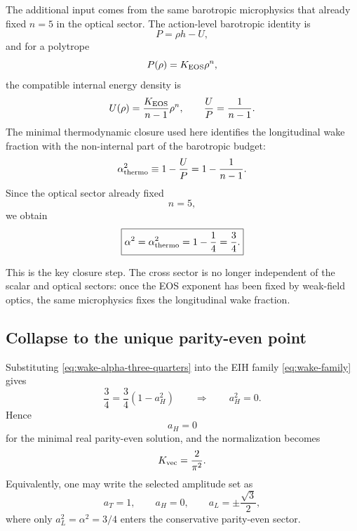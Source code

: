 \documentclass[11pt]{article}
\begin{document}
The additional input comes from the same barotropic microphysics that already fixed
\(n=5\) in the optical sector. The action-level barotropic identity is
\begin{equation}
P=\rho h-U,
\label{eq:wake-thermo-identity}
\end{equation}
and for a polytrope
\begin{equation}
P(\rho)=K_{\rm EOS}\rho^n,
\label{eq:wake-thermo-polytrope}
\end{equation}
the compatible internal energy density is
\begin{equation}
U(\rho)=\frac{K_{\rm EOS}}{n-1}\rho^n,
\qquad
\frac{U}{P}=\frac{1}{n-1}.
\label{eq:wake-UP-ratio}
\end{equation}
The minimal thermodynamic closure used here identifies the longitudinal wake fraction with
the non-internal part of the barotropic budget:
\begin{equation}
\alpha^2_{\rm thermo}
\equiv
1-\frac{U}{P}
=
1-\frac{1}{n-1}.
\label{eq:wake-thermo-alpha}
\end{equation}
Since the optical sector already fixed
\begin{equation}
n=5,
\label{eq:wake-n-five}
\end{equation}
we obtain
\begin{equation}
\boxed{
\alpha^2=\alpha^2_{\rm thermo}=1-\frac14=\frac34.
}
\label{eq:wake-alpha-three-quarters}
\end{equation}

This is the key closure step. The cross sector is no longer independent of the scalar and
optical sectors: once the EOS exponent has been fixed by weak-field optics, the same
microphysics fixes the longitudinal wake fraction.

\subsection{Collapse to the unique parity-even point}
\label{sec:wake-unique}

Substituting \eqref{eq:wake-alpha-three-quarters} into the EIH family
\eqref{eq:wake-family} gives
\begin{equation}
\frac34=\frac34(1-a_H^2)
\qquad\Longrightarrow\qquad
a_H^2=0.
\label{eq:wake-aH-zero}
\end{equation}
Hence
\begin{equation}
a_H=0
\label{eq:wake-aH-zero-sign}
\end{equation}
for the minimal real parity-even solution, and the normalization becomes
\begin{equation}
K_{\rm vec}=\frac{2}{\pi^2}.
\label{eq:wake-K-two-over-pi2}
\end{equation}
Equivalently, one may write the selected amplitude set as
\begin{equation}
a_T=1,
\qquad
a_H=0,
\qquad
a_L=\pm\frac{\sqrt3}{2},
\label{eq:wake-amplitudes}
\end{equation}
where only \(a_L^2=\alpha^2=3/4\) enters the conservative parity-even sector.
\end{document}
